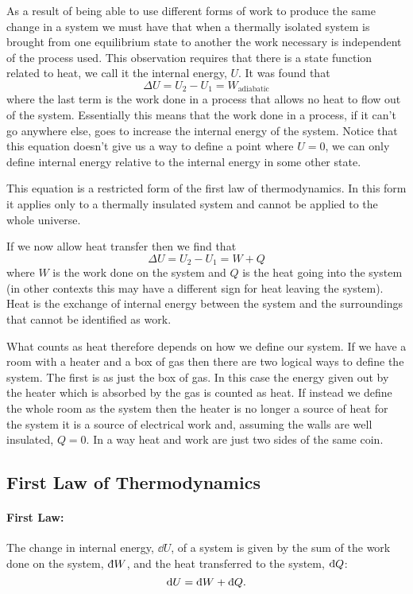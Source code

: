 \documentclass[a4paper]{article}
\newcommand{\ddbar}[1]{\text{\dj}{#1}}
\begin{document}
    As a result of being able to use different forms of work to produce the same change in a system we must have that when a thermally isolated system is brought from one equilibrium state to another the work necessary is independent of the process used.
    This observation requires that there is a state function related to heat, we call it the internal energy, \(U\).
    It was found that
    \[\Delta U = U_2 - U_1 = W_\text{adiabatic}\]
    where the last term is the work done in a process that allows no heat to flow out of the system.
    Essentially this means that the work done in a process, if it can't go anywhere else, goes to increase the internal energy of the system.
    Notice that this equation doesn't give us a way to define a point where \(U = 0\), we can only define internal energy relative to the internal energy in some other state.
    
    This equation is a restricted form of the first law of thermodynamics.
    In this form it applies only to a thermally insulated system and cannot be applied to the whole universe.
    
    If we now allow heat transfer then we find that
    \[\Delta U = U_2 - U_1 = W + Q\]
    where \(W\) is the work done on the system and \(Q\) is the heat going into the system (in other contexts this may have a different sign for heat leaving the system).
    Heat is the exchange of internal energy between the system and the surroundings that cannot be identified as work.
    
    What counts as heat therefore depends on how we define our system.
    If we have a room with a heater and a box of gas then there are two logical ways to define the system.
    The first is as just the box of gas.
    In this case the energy given out by the heater which is absorbed by the gas is counted as heat.
    If instead we define the whole room as the system then the heater is no longer a source of heat for the system it is a source of electrical work and, assuming the walls are well insulated, \(Q = 0\).
    In a way heat and work are just two sides of the same coin.
    
    \subsection{First Law of Thermodynamics}
    \paragraph{First Law:} The change in internal energy, \(\dd{U}\), of a system is given by the sum of the work done on the system, \(\ddbar{W}\), and the heat transferred to the system, \(\ddbar{Q}\):
    \[\dd{U} = \ddbar{W} + \ddbar{Q}.\]
    
\end{document}
